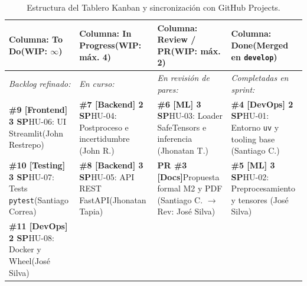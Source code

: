 \documentclass[12pt,letterpaper]{article}
\begin{document}
\begin{table}[!htbp]
\centering
\caption{Estructura del Tablero Kanban y sincronización con GitHub Projects.}
\label{tab:kanban_board}
\footnotesize
\setlength{\tabcolsep}{3.8pt}
\begin{tabularx}{\textwidth}{>{\raggedright\arraybackslash}p{3.5cm} >{\raggedright\arraybackslash}p{3.7cm} >{\raggedright\arraybackslash}p{4.3cm} >{\raggedright\arraybackslash}X}
\toprule
\textbf{Columna: To Do\newline (WIP: $\infty$)} & \textbf{Columna: In Progress\newline (WIP: máx. 4)} & \textbf{Columna: Review / PR\newline (WIP: máx. 2)} & \textbf{Columna: Done\newline (Merged en \texttt{develop})} \\
\midrule
\textit{Backlog refinado:} & \textit{En curso:} & \textit{En revisión de pares:} & \textit{Completadas en sprint:} \\
\textbf{\#9 [Frontend] 3 SP}\newline HU-06: UI Streamlit\newline (John Restrepo) &
\textbf{\#7 [Backend] 2 SP}\newline HU-04: Postproceso e incertidumbre (John R.) &
\textbf{\#6 [ML] 3 SP}\newline HU-03: Loader SafeTensors e inferencia (Jhonatan T.) &
\textbf{\#4 [DevOps] 2 SP}\newline HU-01: Entorno \texttt{uv} y tooling base (Santiago C.) \\[2pt]
\textbf{\#10 [Testing] 3 SP}\newline HU-07: Tests \texttt{pytest}\newline (Santiago Correa) &
\textbf{\#8 [Backend] 3 SP}\newline HU-05: API REST FastAPI\newline (Jhonatan Tapia) &
\textbf{PR \#3 [Docs]}\newline Propuesta formal M2 y PDF (Santiago C. $\rightarrow$ Rev: José Silva) &
\textbf{\#5 [ML] 3 SP}\newline HU-02: Preprocesamiento y tensores (José Silva) \\[2pt]
\textbf{\#11 [DevOps] 2 SP}\newline HU-08: Docker y Wheel\newline (José Silva) & & & \\
\bottomrule
\end{tabularx}
\end{table}
\end{document}
